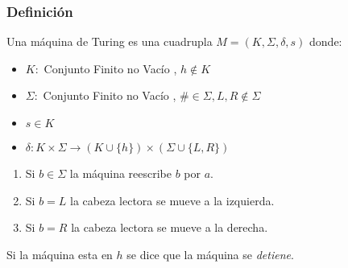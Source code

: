\subsubsection*{Definición}
Una máquina de Turing es una cuadrupla $M=(K,\Sigma,\delta,s)$ donde:
\begin{itemize}
\item $K:$ Conjunto Finito no Vacío , $h\notin K$
\item $\Sigma:$ Conjunto Finito no Vacío , $\#\in\Sigma , L,R\notin\Sigma$
\item $s\in K$
\item $\delta : K\times\Sigma \rightarrow (K\cup\{h\}) \times (\Sigma\cup\{L,R\})$
\end{itemize}

\begin{enumerate}
\item {\color{red} Si $b\in\Sigma$ } la máquina reescribe $b$ por $a$.
\item {\color{red} Si $b=L$ } la cabeza lectora se mueve a la izquierda.
\item {\color{red} Si $b=R$ } la cabeza lectora se mueve a la derecha.
\end{enumerate}
\begin{center}
{\color{red}  Si la máquina esta en $h$} se dice que la máquina se \textit{detiene}.
\end{center}
